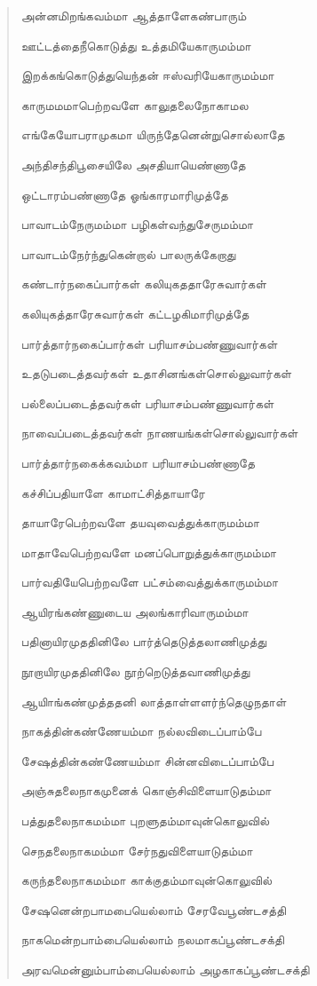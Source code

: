 \documentclass{article}
\begin{document}
\begin{quotation}
{அன்னமிறங்கவம்மா ஆத்தாளேகண்பாரும்

ஊட்டத்தைநீகொடுத்து உத்தமியேகாருமம்மா

இறக்கங்கொடுத்துயெந்தன் ஈஸ்வரியேகாருமம்மா

காருமமமாபெற்றவளே காலுதலைநோகாமல

எங்கேயோபராமுகமா யிருந்தேனென்றுசொல்லாதே

அந்திசந்திபூசையிலே அசதியாயெண்ணாதே

ஒட்டாரம்பண்ணாதே ஓங்காரமாரிமுத்தே

பாவாடம்நேருமம்மா பழிகள்வந்துசேருமம்மா

பாவாடம்நேர்ந்துகென்றால் பாலருக்கேறாது

கண்டார்நகைப்பார்கள் கலியுகததாரேசுவார்கள்

கலியுகத்தாரேசுவார்கள் கட்டழகிமாரிமுத்தே

பார்த்தார்நகைப்பார்கள் பரியாசம்பண்ணுவார்கள்

உதடுபடைத்தவர்கள் உதாசினங்கள்சொல்லுவார்கள்

பல்லைப்படைத்தவர்கள் பரியாசம்பண்ணுவார்கள்

நாவைப்படைத்தவர்கள் நாணயங்கள்சொல்லுவார்கள்

பார்த்தார்நகைக்கவம்மா பரியாசம்பண்ணாதே

கச்சிப்பதியாளே காமாட்சித்தாயாரே

தாயாரேபெற்றவளே தயவுவைத்துக்காருமம்மா

மாதாவேபெற்றவளே மனப்பொறுத்துக்காருமம்மா

பார்வதியேபெற்றவளே பட்சம்வைத்துக்காருமம்மா

ஆயிரங்கண்ணுடைய அலங்காரிவாருமம்மா

பதினாயிரமுததினிலே பார்த்தெடுத்தலாணிமுத்து

நூறாயிரமுததினிலே நூற்றெடுத்தவாணிமுத்து

ஆயிாங்கண்‌முத்ததனி லாத்தாள்ளளர்ந்தெழுநதாள்‌

நாகத்தின்கண்ணேயம்மா நல்லவிடைப்பாம்பே

சேஷத்தின்கண்ணேயம்மா சின்னவிடைப்பாம்பே

அஞ்சுதலைநாகமுனைக் கொஞ்சிவிளையாடுதம்மா

பத்துதலைநாகமம்மா புறளுதம்மாவுன்கொலுவில்

செநதலைநாகமம்மா சேர்நதுவிளையாடுதம்மா

கருந்தலைநாகமம்மா காக்குதம்மாவுன்கொலுவில்

சேஷனென்றபாமபையெல்லாம் சேரவேபூண்டசத்தி

நாகமென்றபாம்பையெல்லாம் நலமாகப்பூண்டசக்தி

அரவமென்னும்பாம்பையெல்லாம் அழகாகப்பூண்டசக்தி

}
\end{quotation}
\end{document}
